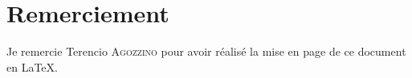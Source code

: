 \section{Remerciement}
\label{sec:remerciement}

Je remercie Terencio \textsc{Agozzino} pour avoir réalisé la mise en page de ce document en \LaTeX.